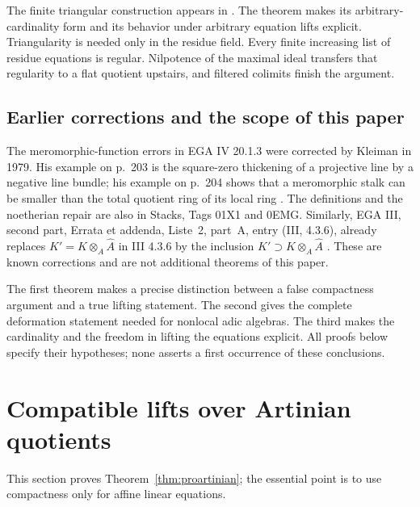 \documentclass[11pt]{article}
\theoremstyle{definition}\newtheorem{definition}[theorem]{Definition}
\theoremstyle{remark}\newtheorem{remark}[theorem]{Remark}
\begin{document}
The finite triangular construction appears in \cite[Tag~07BV, Lemma~10.158.11]{Stacks}. The theorem makes its arbitrary-cardinality form and its behavior under arbitrary equation lifts explicit. Triangularity is needed only in the residue field. Every finite increasing list of residue equations is regular. Nilpotence of the maximal ideal transfers that regularity to a flat quotient upstairs, and filtered colimits finish the argument.

\subsection*{Earlier corrections and the scope of this paper}

The meromorphic-function errors in EGA IV 20.1.3 were corrected by Kleiman in 1979. His example on p.~203 is the square-zero thickening of a projective line by a negative line bundle; his example on p.~204 shows that a meromorphic stalk can be smaller than the total quotient ring of its local ring \cite{Kleiman}. The definitions and the noetherian repair are also in Stacks, Tags 01X1 and 0EMG. Similarly, EGA III, second part, Errata et addenda, Liste~2, part~A, entry (III, 4.3.6), already replaces $K'=K\otimes_A\widehat A$ in III 4.3.6 by the inclusion $K'\supset K\otimes_A\widehat A$ \cite{EGAIII2}. These are known corrections and are not additional theorems of this paper.

The first theorem makes a precise distinction between a false compactness argument and a true lifting statement. The second gives the complete deformation statement needed for nonlocal adic algebras. The third makes the cardinality and the freedom in lifting the equations explicit. All proofs below specify their hypotheses; none asserts a first occurrence of these conclusions.

\section{Compatible lifts over Artinian quotients}

This section proves Theorem~\ref{thm:proartinian}; the essential point is to use compactness only for affine linear equations.
\end{document}

